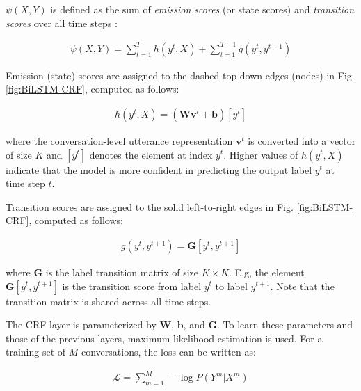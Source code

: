 \documentclass[11pt,a4paper]{article}
\begin{document}
$\psi(X,Y)$ is defined as the sum of \textit{emission scores} (or state scores) and \textit{transition scores} over all time steps \citep{morris2006combining,chen2019transfer}:

{\small
\setlength{\abovedisplayskip}{-3pt}
\setlength{\belowdisplayskip}{3pt}
\begin{align}
    \psi(X,Y) = \sum_{t=1}^{T} h(y^t, X) + \sum_{t=1}^{T-1} g(y^t,y^{t+1})
\end{align}
}

\noindent Emission (state) scores are assigned to the dashed top-down edges (nodes) in Fig. \ref{fig:BiLSTM-CRF}, computed as follows:

{\small
\setlength{\abovedisplayskip}{-3pt}
\setlength{\belowdisplayskip}{3pt}
\begin{align}
    h(y^t, X) = (\mathbf{W}\mathbf{v}^t + \mathbf{b})[y^t]
\end{align}
}

\noindent where the conversation-level utterance representation $\mathbf{v}^t$ is converted into a vector of size $K$ and $[y^t]$ denotes the element at index $y^t$.
Higher values of $h(y^t, X)$ indicate that the model is more confident in predicting the output label $y^t$ at time step $t$.

\noindent Transition scores are assigned to the solid left-to-right edges in Fig. \ref{fig:BiLSTM-CRF}, computed as follows:

{\small
\setlength{\abovedisplayskip}{-3pt}
\setlength{\belowdisplayskip}{3pt}
\begin{align}
    g(y^t,y^{t+1}) = \mathbf{G}[y^t,y^{t+1}]
\end{align}
}

\noindent where $\mathbf{G}$ is the label transition matrix of size $K \times K$.
E.g, the element $\mathbf{G}[y^t,y^{t+1}]$ is the transition score from label $y^t$ to label $y^{t+1}$.
Note that the transition matrix is shared across all time steps.

The CRF layer is parameterized by $\mathbf{W}$, $\mathbf{b}$, and $\mathbf{G}$.
To learn these parameters and those of the previous layers, maximum likelihood estimation is used.
For a training set of $M$ conversations, the loss can be written as:

{\small
\setlength{\abovedisplayskip}{-3pt}
\setlength{\belowdisplayskip}{3pt}
\begin{align}
   \mathcal{L} = \sum_{m=1}^M - \log P(Y^{m}|X^{m}) 
\end{align}
}
\end{document}
